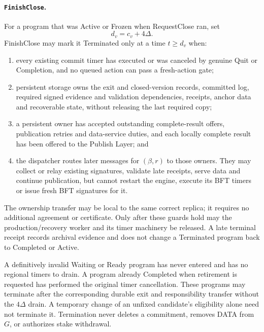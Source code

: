 \paragraph{\texttt{FinishClose}.}
For a program that was Active or Frozen when RequestClose ran, set
\[
 d_v=c_v+4\Delta.
\]
FinishClose may mark it Terminated only at a time $t\ge d_v$ when:
\begin{enumerate}[label=(\roman*),itemsep=2pt]
\item every existing commit timer has executed or was canceled by
genuine Quit or Completion, and no queued action can pass a fresh-action
gate;
\item persistent storage owns the exit and closed-version records,
committed log, required signed evidence and validation dependencies,
receipts, anchor data and recoverable state, without releasing the last
required copy;
\item a persistent owner has accepted outstanding complete-result
offers, publication retries and data-service duties, and each locally
complete result has been offered to the Publish Layer; and
\item the dispatcher routes later messages for $(\beta,r)$ to those
owners. They may collect or relay existing signatures, validate late
receipts, serve data and continue publication, but cannot restart the
engine, execute its BFT timers or issue fresh BFT signatures for it.
\end{enumerate}
The ownership transfer may be local to the same correct replica; it
requires no additional agreement or certificate. Only after these
guards hold may the production/recovery worker and its timer machinery
be released. A late terminal receipt records archival evidence and does
not change a Terminated program back to Completed or Active.

A definitively invalid Waiting or Ready program has never entered
and has no regional timers to drain. A program already Completed when
retirement is requested has performed the original timer cancellation.
These programs may terminate after the corresponding durable exit and
responsibility transfer without the $4\Delta$ drain. A temporary change
of an unfixed candidate's eligibility alone need not terminate it.
Termination never deletes a commitment, removes DATA from $G$, or
authorizes stake withdrawal.

